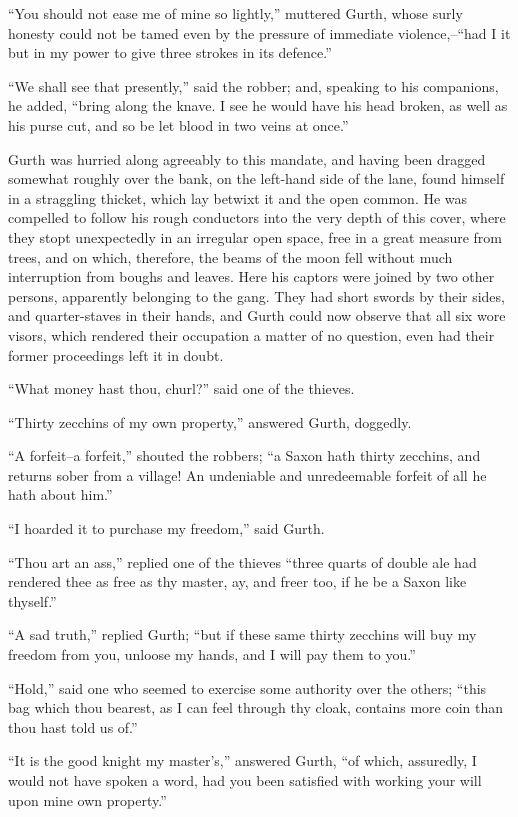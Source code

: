 ``You should not ease me of mine so lightly,'' muttered Gurth, whose
surly honesty could not be tamed even by the pressure of immediate
violence,--``had I it but in my power to give three strokes in its
defence.''

``We shall see that presently,'' said the robber; and, speaking to his
companions, he added, ``bring along the knave. I see he would have his
head broken, as well as his purse cut, and so be let blood in two veins
at once.''

Gurth was hurried along agreeably to this mandate, and having been
dragged somewhat roughly over the bank, on the left-hand side of the
lane, found himself in a straggling thicket, which lay betwixt it and
the open common. He was compelled to follow his rough conductors into
the very depth of this cover, where they stopt unexpectedly in an
irregular open space, free in a great measure from trees, and on which,
therefore, the beams of the moon fell without much interruption from
boughs and leaves. Here his captors were joined by two other persons,
apparently belonging to the gang. They had short swords by their sides,
and quarter-staves in their hands, and Gurth could now observe that all
six wore visors, which rendered their occupation a matter of no
question, even had their former proceedings left it in doubt.

``What money hast thou, churl?'' said one of the thieves.

``Thirty zecchins of my own property,'' answered Gurth, doggedly.

``A forfeit--a forfeit,'' shouted the robbers; ``a Saxon hath thirty
zecchins, and returns sober from a village! An undeniable and
unredeemable forfeit of all he hath about him.''

``I hoarded it to purchase my freedom,'' said Gurth.

``Thou art an ass,'' replied one of the thieves ``three quarts of double
ale had rendered thee as free as thy master, ay, and freer too, if he be
a Saxon like thyself.''

``A sad truth,'' replied Gurth; ``but if these same thirty zecchins will
buy my freedom from you, unloose my hands, and I will pay them to you.''

``Hold,'' said one who seemed to exercise some authority over the
others; ``this bag which thou bearest, as I can feel through thy cloak,
contains more coin than thou hast told us of.''

``It is the good knight my master's,'' answered Gurth, ``of which,
assuredly, I would not have spoken a word, had you been satisfied with
working your will upon mine own property.''

